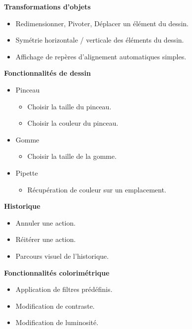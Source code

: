 \documentclass[11pt, a4paper, french]{article}
\begin{document}
			\textbf{Transformations d'objets}
			\begin{itemize}[label=\textbullet]
				\item Redimensionner, Pivoter, Déplacer un élément du dessin.
				\item Symétrie horizontale / verticale des éléments du dessin.
				\item Affichage de repères d'alignement automatiques simples.\\
			\end{itemize}

			\textbf{Fonctionnalités de dessin}
			\begin{itemize}[label=\textbullet]
				\item Pinceau
					\begin{itemize}[label=\textbullet]
						\item Choisir la taille du pinceau.
						\item Choisir la couleur du pinceau.
					\end{itemize}
				\item Gomme
					\begin{itemize}[label=\textbullet]
						\item Choisir la taille de la gomme.
					\end{itemize}
				\item Pipette
					\begin{itemize}[label=\textbullet]
						\item Récupération de couleur sur un emplacement. \\
					\end{itemize}
			\end{itemize}

			\textbf{Historique}
			\begin{itemize}[label=\textbullet]
				\item Annuler une action.
				\item Réitérer une action.
				\item Parcours visuel de l'historique. \\
			\end{itemize}

			\textbf{Fonctionnalités colorimétrique}
			\begin{itemize}[label=\textbullet]
				\item Application de filtres prédéfinis.
				\item Modification de contraste.
				\item Modification de luminosité.
			\end{itemize}
\end{document}
